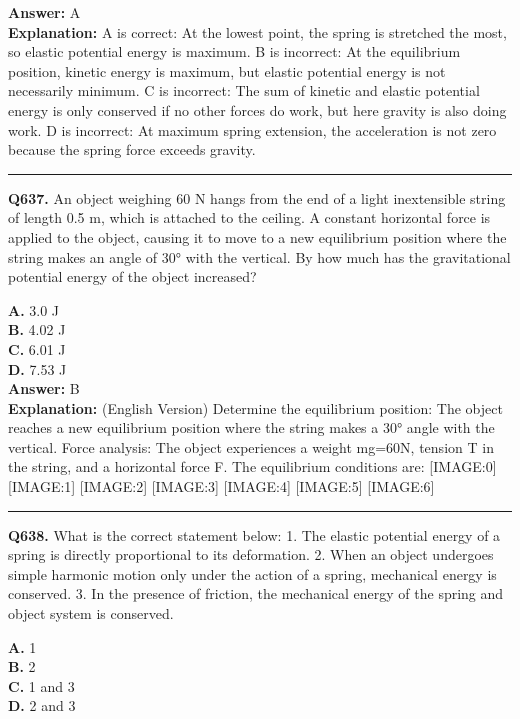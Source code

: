 \documentclass[12pt]{article}
\begin{document}
\textbf{Answer:} A \\
\textbf{Explanation:} \cdot 
A is correct: At the lowest point, the spring is stretched the most, so elastic potential energy is maximum.
\cdot 
B is incorrect: At the equilibrium position, kinetic energy is maximum, but elastic potential energy is not necessarily minimum.
\cdot 
C is incorrect: The sum of kinetic and elastic potential energy is only conserved if no other forces do work, but here gravity is also doing work.
\cdot 
D is incorrect: At maximum spring extension, the acceleration is not zero because the spring force exceeds gravity.

\hrule
\vspace{1em}


\noindent
\textbf{Q637.} An object weighing 60 N hangs from the end of a light inextensible string of length 0.5 m, which is attached to the ceiling. A constant horizontal force is applied to the object, causing it to move to a new equilibrium position where the string makes an angle of 30° with the vertical. By how much has the gravitational potential energy of the object increased?



\textbf{A.} 3.0 J \\
\textbf{B.} 4.02 J \\
\textbf{C.} 6.01 J \\
\textbf{D.} 7.53 J \\

\textbf{Answer:} B \\
\textbf{Explanation:} (English Version)
Determine the equilibrium position: The object reaches a new equilibrium position where the string makes a 30° angle with the vertical.
Force analysis: The object experiences a weight mg=60N, tension T in the string, and a horizontal force F. The equilibrium conditions are:
[IMAGE:0]
[IMAGE:1]
[IMAGE:2]
[IMAGE:3]
[IMAGE:4]
[IMAGE:5]
[IMAGE:6]

\hrule
\vspace{1em}


\noindent
\textbf{Q638.} What is the correct statement below:
1.
The elastic potential energy of a spring is directly proportional to its deformation.
2.
When an object undergoes simple harmonic motion
only
under the action of a spring, mechanical energy is conserved.
3.
In the presence of friction, the mechanical energy of the spring and object system is conserved.



\textbf{A.} 1 \\
\textbf{B.} 2 \\
\textbf{C.} 1 and 3 \\
\textbf{D.} 2 and 3 \\
\end{document}
